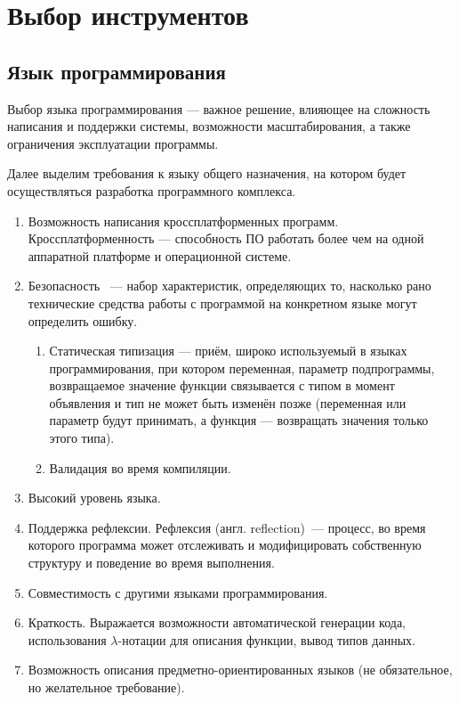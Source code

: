 \chapter{Выбор инструментов} 

\section{Язык программирования}
Выбор языка программирования --- важное решение, влияющее на сложность написания и поддержки системы, возможности масштабирования, а также ограничения эксплуатации программы.

Далее выделим требования к языку общего назначения, на котором будет осуществляться разработка программного комплекса.
\begin{enumerate}
	\item Возможность написания кроссплатформенных программ. Кроссплатформенность --- способность ПО работать более чем на одной аппаратной платформе и операционной системе.
	\item Безопасность ~--- набор характеристик, определяющих то, насколько рано технические средства работы с программой на конкретном языке могут определить ошибку. 
	\begin{enumerate}
		\item Статическая типизация — приём, широко используемый в языках программирования, при котором переменная, параметр подпрограммы, возвращаемое значение функции связывается с типом в момент объявления и тип не может быть изменён позже (переменная или параметр будут принимать, а функция — возвращать значения только этого типа).
		\item Валидация во время компиляции.
	\end{enumerate}
	\item Высокий уровень языка.
	\item Поддержка рефлексии. Рефлексия (англ. reflection)~--- процесс, во время которого программа может отслеживать и модифицировать собственную структуру и поведение во время выполнения.
	\item Совместимость с другими языками программирования. 
	\item Краткость. Выражается возможности автоматической генерации кода, использования $ \lambda $-нотации для описания функции, вывод типов данных.
	\item Возможность описания предметно-ориентированных языков (не обязательное, но желательное требование).
\end{enumerate}

